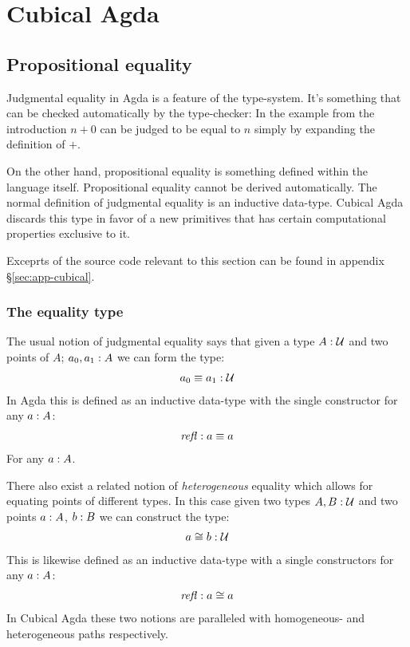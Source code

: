 \chapter{Cubical Agda}
\section{Propositional equality}
Judgmental equality in Agda is a feature of the type-system. It's something that
can be checked automatically by the type-checker: In the example from the
introduction $n + 0$ can be judged to be equal to $n$ simply by expanding the
definition of $+$.

On the other hand, propositional equality is something defined within the
language itself. Propositional equality cannot be derived automatically. The
normal definition of judgmental equality is an inductive data-type. Cubical Agda
discards this type in favor of a new primitives that has certain computational
properties exclusive to it.

Exceprts of the source code relevant to this section can be found in appendix
\S\ref{sec:app-cubical}.

\subsection{The equality type}
The usual notion of judgmental equality says that given a type $A \mathrel{:} \mathcal{U}$ and
two points of $A$; $a_0, a_1 \mathrel{:} A$ we can form the type:
%
\begin{align}
  a_0 \equiv a_1 \mathrel{:} \mathcal{U}
\end{align}
%
In Agda this is defined as an inductive data-type with the single constructor
for any $a \mathrel{:} A$:
%
\begin{align}
  \refl \tp a \equiv a
\end{align}
%
For any $a \mathrel{:} A$.

There also exist a related notion of \emph{heterogeneous} equality which allows
for equating points of different types. In this case given two types $A, B \mathrel{:}
\mathcal{U}$ and two points $a \mathrel{:} A$, $b \mathrel{:} B$ we can construct the type:
%
\begin{align}
  a \cong b \mathrel{:} \mathcal{U}
\end{align}
%
This is likewise defined as an inductive data-type with a single constructors
for any $a \mathrel{:} A$:
%
\begin{align}
  \refl \tp a \cong a
\end{align}
%
In Cubical Agda these two notions are paralleled with homogeneous- and
heterogeneous paths respectively.
%

